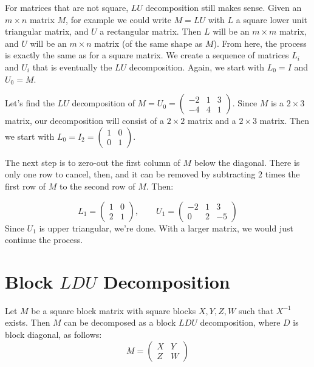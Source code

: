 
For matrices that are not square, $LU$ decomposition still makes sense.  Given an $m\times n$ matrix $M$, for example we could write $M=LU$ with $L$ a square lower unit triangular matrix, and $U$ a rectangular matrix.  Then $L$ will be an $m\times m$ matrix, and $U$ will be an $m\times n$ matrix (of the same shape as $M$).  From here, the process is exactly the same as for a square matrix.  We create a sequence of matrices $L_i$ and $U_i$ that is eventually the $LU$ decomposition.  Again, we start with $L_0=I$ and $U_0=M$.

\begin{example}
Let's find the $LU$ decomposition of $M=U_0=\begin{pmatrix}
-2 & 1 & 3 \\
-4 & 4 & 1 
\end{pmatrix}$.  Since $M$ is a $2\times 3$ matrix, our decomposition will consist of a $2\times 2$ matrix and a $2\times 3$ matrix.  Then we start with $L_0=I_2=\begin{pmatrix}
1 & 0 \\
0 & 1
\end{pmatrix}$.

The next step is to zero-out the first column of $M$ below the diagonal.  There is only one row to cancel, then, and it can be removed by subtracting $2$ times the first row of $M$ to the second row of $M$.  Then:

\[
L_1=\begin{pmatrix}
1 & 0 \\
2 & 1
\end{pmatrix}, \qquad 
U_1 = \begin{pmatrix}
-2 & 1 & 3 \\
0 & 2 & -5 
\end{pmatrix}
\]
Since $U_1$ is upper triangular, we're done.  With a larger matrix, we would just continue the process.
\end{example}





\section{Block $LDU$ Decomposition}

Let $M$ be a square block matrix with square blocks $X,Y,Z,W$ such that $X^{-1}$ exists.  Then $M$ can be decomposed as a block $LDU$ decomposition, where $D$ is block diagonal, as follows:
\[
M=\begin{pmatrix}
X & Y \\
Z & W
\end{pmatrix}
\]


